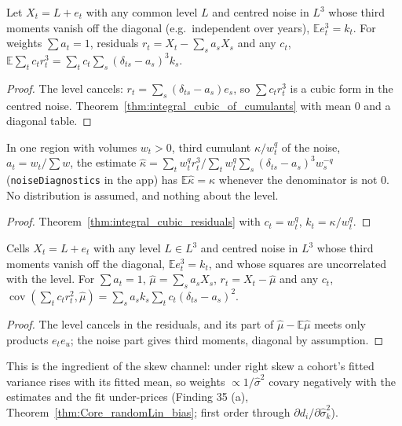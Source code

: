 \begin{theorem}\label{thm:integral_cubic_residuals}
  \leanok
  Let $X_t = L + e_t$ with any common level $L$ and centred noise in $L^3$ whose third moments
  vanish off the diagonal (e.g.\ independent over years), $\mathbb E e_t^3 = k_t$. For weights
  $\sum a_t = 1$, residuals $r_t = X_t - \sum_s a_sX_s$ and any $c_t$,
  $\mathbb E\sum_t c_tr_t^3 = \sum_t c_t\sum_s(\delta_{ts} - a_s)^3k_s$.
\end{theorem}
\begin{proof}
  \leanok
  The level cancels: $r_t = \sum_s(\delta_{ts} - a_s)e_s$, so $\sum c_tr_t^3$ is a cubic form in the
  centred noise. Theorem~\ref{thm:integral_cubic_of_cumulants} with mean $0$ and a diagonal table.
\end{proof}

\begin{theorem}\label{thm:kappaHat_unbiased}
  \leanok
  In one region with volumes $w_t > 0$, third cumulant $\kappa/w_t^q$ of the noise,
  $a_t = w_t/\sum w$, the estimate
  $\hat\kappa = \sum_t w_t^qr_t^3 / \sum_t w_t^q\sum_s(\delta_{ts} - a_s)^3w_s^{-q}$
  (\texttt{noiseDiagnostics} in the app) has $\mathbb E\hat\kappa = \kappa$ whenever the denominator is not $0$.
  No distribution is assumed, and nothing about the level.
\end{theorem}
\begin{proof}
  \leanok
  Theorem~\ref{thm:integral_cubic_residuals} with $c_t = w_t^q$, $k_t = \kappa/w_t^q$.
\end{proof}

\begin{theorem}\label{thm:covariance_resVar_mean}
  \leanok
  Cells $X_t = L + e_t$ with any level $L\in L^3$ and centred noise in $L^3$ whose third moments
  vanish off the diagonal, $\mathbb Ee_t^3 = k_t$, and whose squares are uncorrelated with the level.
  For $\sum a_t = 1$, $\hat\mu = \sum_sa_sX_s$, $r_t = X_t - \hat\mu$ and any $c_t$,
  $\operatorname{cov}(\sum_tc_tr_t^2, \hat\mu) = \sum_sa_sk_s\sum_tc_t(\delta_{ts} - a_s)^2$.
\end{theorem}
\begin{proof}
  \leanok
  The level cancels in the residuals, and its part of $\hat\mu - \mathbb E\hat\mu$ meets only
  products $e_te_u$; the noise part gives third moments, diagonal by assumption.
\end{proof}
\begin{remark}[Finding 35 (c)]
  This is the ingredient of the skew channel: under right skew a cohort's fitted variance rises
  with its fitted mean, so weights $\propto 1/\hat\sigma^2$ covary negatively with the estimates
  and the fit under-prices (Finding 35 (a), Theorem~\ref{thm:Core_randomLin_bias}; first order
  through $\partial d_i/\partial\hat\sigma_k^2$).
\end{remark}

